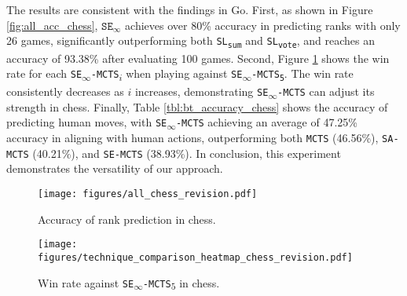 The results are consistent with the findings in Go.
First, as shown in Figure \ref{fig:all_acc_chess}, $\texttt{SE}_{\infty}$ achieves over 80\% accuracy in predicting ranks with only 26 games, significantly outperforming both \texttt{SL\textsubscript{sum}} and \texttt{SL\textsubscript{vote}}, and reaches an accuracy of 93.38\% after evaluating 100 games.
Second, Figure \ref{fig:fight_chess} shows the win rate for each \texttt{SE\textsubscript{$\infty$}-MCTS\textsubscript{$i$}} when playing against \texttt{SE\textsubscript{$\infty$}-MCTS\textsubscript{5}}.
The win rate consistently decreases as $i$ increases, demonstrating \texttt{SE\textsubscript{$\infty$}-MCTS} can adjust its strength in chess.
Finally, Table \ref{tbl:bt_accuracy_chess} shows the accuracy of predicting human moves, with \texttt{SE\textsubscript{$\infty$}-MCTS} achieving an average of 47.25\% accuracy in aligning with human actions, outperforming both \texttt{MCTS} (46.56\%), \texttt{SA-MCTS} (40.21\%), and \texttt{SE-MCTS} (38.93\%).
In conclusion, this experiment demonstrates the versatility of our approach.


\begin{figure}[htbp]
\centering
\begin{minipage}{0.7\columnwidth}
\begin{minipage}{0.60\linewidth}
    \texttt{[image: figures/all\_chess\_revision.pdf]}
    \caption{Accuracy of rank prediction in chess.}
    \label{fig:all_acc_chess}
\end{minipage}
\hfill
\begin{minipage}{0.38\columnwidth}
 \centering
    \texttt{[image: figures/technique\_comparison\_heatmap\_chess\_revision.pdf]}
     \captionsetup{width=1.2\linewidth}
    \caption{Win rate against \texttt{SE\textsubscript{$\infty$}-MCTS\textsubscript{$5$}} in chess.}

    \label{fig:fight_chess}
\end{minipage}
\end{minipage}
\end{figure}





